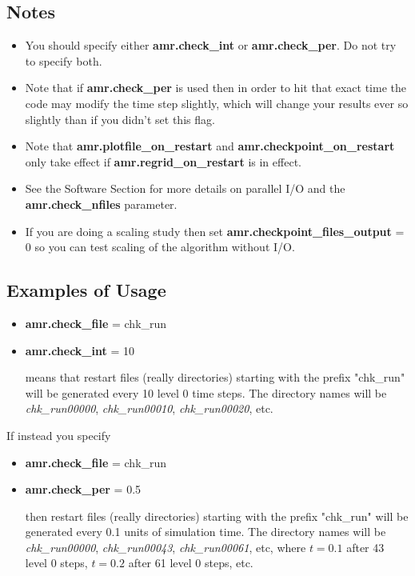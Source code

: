 \subsection{Notes}

\begin{itemize}

\item You should specify either {\bf amr.check\_int} or {\bf amr.check\_per}.  Do not try to specify both. 

\item Note that if {\bf amr.check\_per} is used then in order to hit that exact time the code 
may modify the time step slightly, which will change your results ever so slightly than if 
you didn't set this flag.

\item Note that {\bf amr.plotfile\_on\_restart} and {\bf amr.checkpoint\_on\_restart} 
only take effect if {\bf amr.regrid\_on\_restart} is in effect.

\item See the Software Section for more details on parallel I/O and the 
{\bf amr.check\_nfiles} parameter.

\item If you are doing a scaling study then set {\bf amr.checkpoint\_files\_output} = 0
so you can test scaling of the algorithm without I/O.

\end{itemize}

\subsection{Examples of Usage}

\begin{itemize}

\item {\bf amr.check\_file} = chk\_run
\item {\bf amr.check\_int} = 10

means that restart files (really directories) starting with the prefix "chk\_run" will be
generated every 10 level 0 time steps.  The directory names will be {\it chk\_run00000}, 
{\it chk\_run00010}, {\it chk\_run00020}, etc.

\end{itemize}

If instead you specify

\begin{itemize}

\item {\bf amr.check\_file} = chk\_run
\item {\bf amr.check\_per} = 0.5

then restart files (really directories) starting with the prefix "chk\_run" will be
generated every 0.1 units of simulation time.  The directory names will be {\it chk\_run00000}, 
{\it chk\_run00043}, {\it chk\_run00061}, etc, where $t = 0.1$ after 43 level 0 steps, 
$t = 0.2$ after 61 level 0 steps, etc.

\end{itemize}

